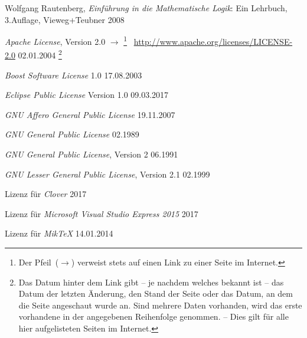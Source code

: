 \begin{flushleft}
	\begin{thebibliography}{12}
		\likechapter[section]{\bibname}  %
		\label{dic:Literaturverzeichnis} %

		Wolfgang Rautenberg,
		\emph{Einführung in die Mathematische Logik}:
		Ein Lehrbuch, 3.\@ Auflage, Vieweg+Teubner 2008

		\emph{Apache License}, Version 2.0
		$\rightarrow$%
		\footnote{%
			Der Pfeil~($\rightarrow$) verweist stets auf einen Link zu einer Seite im Internet.%
		}%
		~\url{http://www.apache.org/licenses/LICENSE-2.0}
		02.01.2004%
		\footnote{%
			Das Datum hinter dem Link gibt -- je nachdem welches bekannt ist -- das Datum der letzten Änderung, den Stand der Seite oder das Datum, an dem die Seite angeschaut wurde an.
			Sind mehrere Daten vorhanden, wird das erste vorhandene in der angegebenen Reihenfolge genommen.
			-- Dies gilt für alle hier aufgelisteten Seiten im Internet.%
		}

		\emph{Boost Software License} 1.0
		17.08.2003

		\emph{Eclipse Public License} Version 1.0
		09.03.2017

		\emph{GNU Affero General Public License}
		19.11.2007

		\emph{GNU General Public License}
		02.1989

		\emph{GNU General Public License}, Version 2
		06.1991

		\emph{GNU Lesser General Public License},
		Version 2.1
		02.1999

		Lizenz für \emph{Clover}
		2017

		Lizenz
		für \emph{Microsoft Visual Studio Express 2015}
		2017

		Lizenz für \emph{MikTeX}
		14.01.2014


\end{thebibliography}
\end{flushleft}
